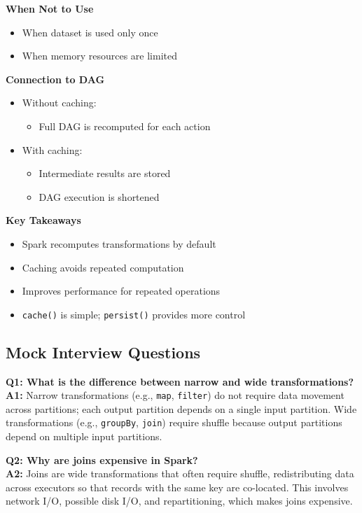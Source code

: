 \documentclass[10pt,a4paper]{article}
\begin{document}
	\textbf{When Not to Use}
	\begin{itemize}
	    \item When dataset is used only once
	    \item When memory resources are limited
	\end{itemize}
	
	\textbf{Connection to DAG}
	\begin{itemize}
	    \item Without caching:
	    \begin{itemize}
	        \item Full DAG is recomputed for each action
	    \end{itemize}
	    \item With caching:
	    \begin{itemize}
	        \item Intermediate results are stored
	        \item DAG execution is shortened
	    \end{itemize}
	\end{itemize}
	
	\textbf{Key Takeaways}
	\begin{itemize}
	    \item Spark recomputes transformations by default
	    \item Caching avoids repeated computation
	    \item Improves performance for repeated operations
	    \item \texttt{cache()} is simple; \texttt{persist()} provides more control
	\end{itemize}
	
	\subsection{Mock Interview Questions}
	
	\textbf{Q1: What is the difference between narrow and wide transformations?} \\
	\textbf{A1:} Narrow transformations (e.g., \texttt{map}, \texttt{filter}) do not require data movement across partitions; each output partition depends on a single input partition. Wide transformations (e.g., \texttt{groupBy}, \texttt{join}) require shuffle because output partitions depend on multiple input partitions.
	
	\vspace{0.5em}
	
	\textbf{Q2: Why are joins expensive in Spark?} \\
	\textbf{A2:} Joins are wide transformations that often require shuffle, redistributing data across executors so that records with the same key are co-located. This involves network I/O, possible disk I/O, and repartitioning, which makes joins expensive.
	
\end{document}
